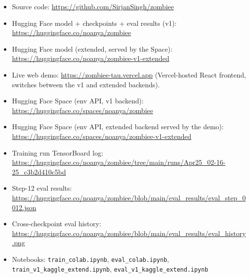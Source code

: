 \documentclass[11pt,a4paper]{article}
\begin{document}
\begin{itemize}[leftmargin=*,nosep]
  \item Source code: \url{https://github.com/SirjanSingh/zombiee}
  \item Hugging Face model + checkpoints + eval results (v1):
        \url{https://huggingface.co/noanya/zombiee}
  \item Hugging Face model (extended, served by the Space):
        \url{https://huggingface.co/noanya/zombiee-v1-extended}
  \item Live web demo: \url{https://zombiee-tau.vercel.app} (Vercel-hosted React frontend, switches between the v1 and extended backends).
  \item Hugging Face Space (env API, v1 backend): \url{https://huggingface.co/spaces/noanya/zombiee}
  \item Hugging Face Space (env API, extended backend served by the demo): \url{https://huggingface.co/spaces/noanya/zombiee-v1-extended}
  \item Training run TensorBoard log: \url{https://huggingface.co/noanya/zombiee/tree/main/runs/Apr25_02-16-25_c3b2d410c5bd}
  \item Step-12 eval results: \url{https://huggingface.co/noanya/zombiee/blob/main/eval_results/eval_step_0012.json}
  \item Cross-checkpoint eval history: \url{https://huggingface.co/noanya/zombiee/blob/main/eval_results/eval_history.png}
  \item Notebooks: \texttt{train\_colab.ipynb}, \texttt{eval\_colab.ipynb}, \texttt{train\_v1\_kaggle\_extend.ipynb}, \texttt{eval\_v1\_kaggle\_extend.ipynb}
\end{itemize}



\end{document}
